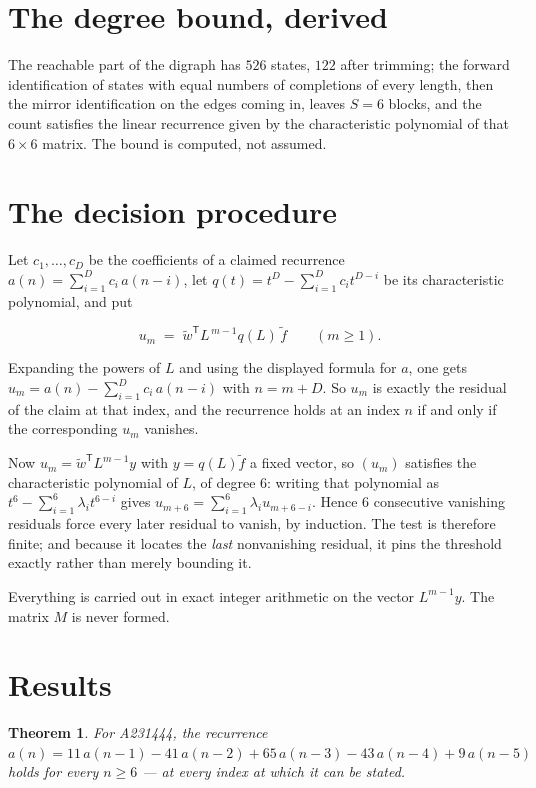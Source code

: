 \documentclass[11pt]{article}
\newtheorem{theorem}{Theorem}
\theoremstyle{definition}
\begin{document}
\section{The degree bound, derived}

The reachable part of the digraph has $526$ states, $122$ after trimming; the forward identification of states with equal numbers of completions of every length, then the mirror identification on the edges coming in, leaves $S = 6$ blocks, and the count satisfies the linear recurrence given by the characteristic polynomial of that $6\times6$ matrix. The bound is computed, not assumed.

\section{The decision procedure}

Let $c_1,\dots,c_D$ be the coefficients of a claimed recurrence $a(n) = \sum_{i=1}^{D} c_i\,a(n-i)$, let $q(t) = t^{D} - \sum_{i=1}^{D} c_i t^{D-i}$ be its characteristic polynomial, and put

\[u_m \;=\; \tilde w^{\mathsf T} L^{\,m-1} q(L)\,\tilde f \qquad (m \ge 1).\]

Expanding the powers of $L$ and using the displayed formula for $a$, one gets $u_m = a(n) - \sum_{i=1}^{D} c_i\,a(n-i)$ with $n = m + D$. So $u_m$ is exactly the residual of the claim at that index, and the recurrence holds at an index $n$ if and only if the corresponding $u_m$ vanishes.

Now $u_m = \tilde w^{\mathsf T} L^{m-1} y$ with $y = q(L)\tilde f$ a fixed vector, so $(u_m)$ satisfies the characteristic polynomial of $L$, of degree $6$: writing that polynomial as $t^{6} - \sum_{i=1}^{6} \lambda_i t^{6-i}$ gives $u_{m+6} = \sum_{i=1}^{6} \lambda_i u_{m+6-i}$. Hence $6$ consecutive vanishing residuals force every later residual to vanish, by induction. The test is therefore finite; and because it locates the {\itshape last} nonvanishing residual, it pins the threshold exactly rather than merely bounding it.

Everything is carried out in exact integer arithmetic on the vector $L^{m-1}y$. The matrix $M$ is never formed.

\section{Results}

\begin{theorem} For A231444, the recurrence $a(n) = 11\,a(n-1) - 41\,a(n-2) + 65\,a(n-3) - 43\,a(n-4) + 9\,a(n-5)$ holds for every $n \ge 6$ --- at every index at which it can be stated.\end{theorem}
\end{document}
